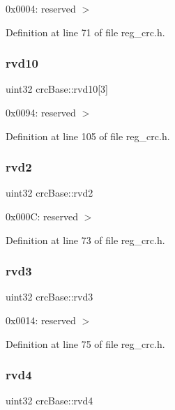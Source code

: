 0x0004\+: reserved $>$ 

Definition at line 71 of file reg\+\_\+crc.\+h.

\mbox{\label{structcrcBase_a20b85e8e66bfc18edf0eb4e91fb17b5f}} 
\subsubsection{\texorpdfstring{rvd10}{rvd10}}
{\footnotesize\ttfamily uint32 crc\+Base\+::rvd10\mbox{[}3\mbox{]}}

0x0094\+: reserved $>$ 

Definition at line 105 of file reg\+\_\+crc.\+h.

\mbox{\label{structcrcBase_a7b3464c084860914aa88d19e7d1898fe}} 
\subsubsection{\texorpdfstring{rvd2}{rvd2}}
{\footnotesize\ttfamily uint32 crc\+Base\+::rvd2}

0x000C\+: reserved $>$ 

Definition at line 73 of file reg\+\_\+crc.\+h.

\mbox{\label{structcrcBase_a1d38774cc9aeabd8c31f72e1e408585a}} 
\subsubsection{\texorpdfstring{rvd3}{rvd3}}
{\footnotesize\ttfamily uint32 crc\+Base\+::rvd3}

0x0014\+: reserved $>$ 

Definition at line 75 of file reg\+\_\+crc.\+h.

\mbox{\label{structcrcBase_af656995e433df006f9d3b42bbeceb635}} 
\subsubsection{\texorpdfstring{rvd4}{rvd4}}
{\footnotesize\ttfamily uint32 crc\+Base\+::rvd4}


